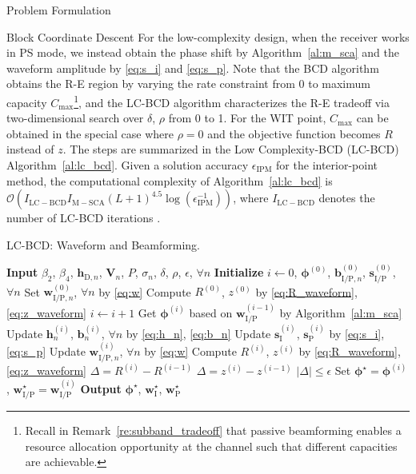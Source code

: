 \documentclass[journal]{IEEEtran}
\begin{document}
\begin{section}{Problem Formulation}
\begin{subsection}{Block Coordinate Descent}
			For the low-complexity design, when the receiver works in PS mode, we instead obtain the phase shift by Algorithm~\ref{al:m_sca} and the waveform amplitude by \eqref{eq:s_i} and \eqref{eq:s_p}. Note that the BCD algorithm obtains the R-E region by varying the rate constraint from \num{0} to maximum capacity $C_{\max}$\footnote{Recall in Remark~\ref{re:subband_tradeoff} that passive beamforming enables a resource allocation opportunity at the channel such that different capacities are achievable.}, and the LC-BCD algorithm characterizes the R-E tradeoff via two-dimensional search over $\delta$, $\rho$ from \num{0} to \num{1}. For the WIT point, $C_{\max}$ can be obtained in the special case where $\rho=0$ and the objective function becomes $R$ instead of $z$. The steps are summarized in the Low Complexity-BCD (LC-BCD) Algorithm~\ref{al:lc_bcd}. Given a solution accuracy $\epsilon_{\mathrm{IPM}}$ for the interior-point method, the computational complexity of Algorithm~\ref{al:lc_bcd} is $\mathcal{O}\left(I_{\mathrm{LC-BCD}}I_{\mathrm{M-SCA}}(L+1)^{4.5} \log(\epsilon_{\mathrm{IPM}}^{-1})\right)$, where $I_{\mathrm{LC-BCD}}$ denotes the number of LC-BCD iterations \cite{Luo2010}.

			\begin{algorithm}[!t]
				\caption{LC-BCD: Waveform and Beamforming.}
				\label{al:lc_bcd}
				\begin{algorithmic}[1]
					\State \textbf{Input} $\beta_2$, $\beta_4$, $\boldsymbol{h}_{\mathrm{D},n}$, $\boldsymbol{V}_{n}$, $P$, $\sigma_n$, $\delta$, $\rho$, $\epsilon$, $\forall n$
					\State \textbf{Initialize} $i \gets 0$, $\boldsymbol{\phi}^{(0)}$, $\boldsymbol{b}_{\mathrm{I/P},n}^{(0)}$, $\boldsymbol{s}_{\mathrm{I/P}}^{(0)}$, $\forall n$
					\State Set $\boldsymbol{w}_{\mathrm{I/P},n}^{(0)}$, $\forall n$ by \eqref{eq:w}
					\State Compute $R^{(0)}$, $z^{(0)}$ by \eqref{eq:R_waveform}, \eqref{eq:z_waveform}
					\Repeat
						\State $i \gets i + 1$
						\State Get $\boldsymbol{\phi}^{(i)}$ based on $\boldsymbol{w}_{\mathrm{I/P}}^{(i-1)}$ by Algorithm~\ref{al:m_sca}
						\State Update $\boldsymbol{h}_n^{(i)}$, $\boldsymbol{b}_n^{(i)}$, $\forall n$ by \eqref{eq:h_n}, \eqref{eq:b_n}
						\State Update $\boldsymbol{s}_{\mathrm{I}}^{(i)}$, $\boldsymbol{s}_{\mathrm{P}}^{(i)}$ by \eqref{eq:s_i}, \eqref{eq:s_p}
						\State Update $\boldsymbol{w}_{\mathrm{I/P},n}^{(i)}$, $\forall n$ by \eqref{eq:w}
						\State Compute $R^{(i)}$, $z^{(i)}$ by \eqref{eq:R_waveform}, \eqref{eq:z_waveform}
							\State $\Delta = R^{(i)} - R^{(i-1)}$
						\Else
							\State $\Delta = z^{(i)} - z^{(i-1)}$
						\EndIf
					\Until $\lvert \Delta \rvert \le \epsilon$
					\State Set $\boldsymbol{\phi}^{\star}=\boldsymbol{\phi}^{(i)}$, $\boldsymbol{w}_{\mathrm{I/P}}^{\star}=\boldsymbol{w}_{\mathrm{I/P}}^{(i)}$
					\State \textbf{Output} $\boldsymbol{\phi}^{\star}$, $\boldsymbol{w}_{\mathrm{I}}^{\star}$, $\boldsymbol{w}_{\mathrm{P}}^{\star}$
				\end{algorithmic}
			\end{algorithm}
		\end{subsection}
	\end{section}
\end{document}
